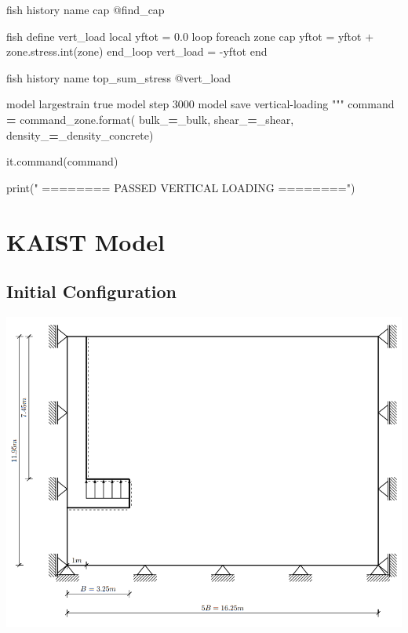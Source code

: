 \documentclass[a4paper, nobind]{templates/ociamthesis}
\newenvironment{Shaded}{\begin{snugshade}}{\end{snugshade}}
\newcommand{\BuiltInTok}[1]{#1}
\newcommand{\NormalTok}[1]{#1}
\newcommand{\OperatorTok}[1]{\textcolor[rgb]{0.81,0.36,0.00}{\textbf{#1}}}
\newcommand{\StringTok}[1]{\textcolor[rgb]{0.31,0.60,0.02}{#1}}
\renewenvironment{Shaded}
{
  \vspace{10pt}%
  \begin{snugshade}%
}{%
  \end{snugshade}%
  \vspace{8pt}%
}
\begin{document}
\begin{Shaded}
\begin{Highlighting}[]
\StringTok{fish history name \textquotesingle{}cap\textquotesingle{} @find\_cap}

\StringTok{fish define vert\_load}
\StringTok{    local yftot = 0.0}
\StringTok{    loop foreach zone cap}
\StringTok{        yftot = yftot + zone.stress.int(zone)}
\StringTok{    end\_loop}
\StringTok{    vert\_load = {-}yftot}
\StringTok{end}

\StringTok{fish history name \textquotesingle{}top\_sum\_stress\textquotesingle{} @vert\_load}

\StringTok{model largestrain true}
\StringTok{model step 3000}
\StringTok{model save \textquotesingle{}vertical{-}loading\textquotesingle{}}
\StringTok{"""}
\NormalTok{command }\OperatorTok{=}\NormalTok{ command\_zone.}\BuiltInTok{format}\NormalTok{(}
\NormalTok{bulk\_}\OperatorTok{=}\NormalTok{\_bulk,}
\NormalTok{shear\_}\OperatorTok{=}\NormalTok{\_shear,}
\NormalTok{density\_}\OperatorTok{=}\NormalTok{\_density\_concrete)}

\NormalTok{it.command(command)}

\BuiltInTok{print}\NormalTok{(}\StringTok{"               ======== PASSED VERTICAL LOADING ========"}\NormalTok{)}
\end{Highlighting}
\end{Shaded}

\newpage

\hypertarget{kaist-model}{%
\chapter{KAIST Model}\label{kaist-model}}

\hypertarget{initial-configuration-1}{%
\section{Initial Configuration}\label{initial-configuration-1}}

\includegraphics[width=1\linewidth]{myfigureeeeee/boundary}
\end{document}
